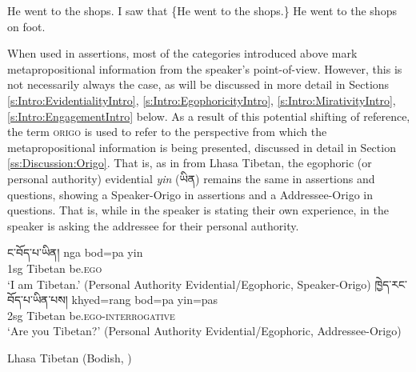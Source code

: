 \begin{exe}
\ex\label{ex:MetapropEnglish}
\begin{xlist}
\ex He went to the shops.
\ex I saw that \{He went to the shops.\}
\ex He went to the shops on foot.
\end{xlist}
\end{exe}

When used in assertions, most of the categories introduced above mark metapropositional information from the speaker's point-of-view. However, this is not necessarily always the case, as will be discussed in more detail in Sections \ref{s:Intro:EvidentialityIntro}, \ref{s:Intro:EgophoricityIntro}, \ref{s:Intro:MirativityIntro}, \ref{s:Intro:EngagementIntro} below. As a result of this potential shifting of reference, the term \textsc{origo} is used to refer to the perspective from which the metapropositional information is being presented, discussed in detail in Section \ref{ss:Discussion:Origo}. That is, as in  from Lhasa Tibetan, the egophoric (or personal authority) evidential \textit{yin} (\foreignlanguage{tibetan}{ཡིན}) remains the same in assertions and questions, showing a Speaker-Origo in assertions and a Addressee-Origo in questions. That is, while in  the speaker is stating their own experience, in  the speaker is asking the addressee for their personal authority.

\begin{exe}
\ex\label{ex:OrigoShift}
\begin{xlist}
\ex\label{ex:OrigoShift:a} \texttibetan{ང་བོད་པ་ཡིན།}
\gll nga bod=pa yin \\
1sg Tibetan be.\textsc{ego} \\
\glt `I am Tibetan.' (Personal Authority Evidential/Egophoric, Speaker-Origo)
\ex\label{ex:OrigoShift:b} \texttibetan{ཁྱེད་རང་བོད་པ་ཡིན་པས།}
\gll khyed=rang bod=pa yin=pas \\
2sg Tibetan be.\textsc{ego}-\textsc{interrogative} \\
\glt `Are you Tibetan?' (Personal Authority Evidential/Egophoric, Addressee-Origo)
\end{xlist}
Lhasa Tibetan (Bodish, \tibetnat) \cite[394]{DeLancey2017Tibetan}
\end{exe}



